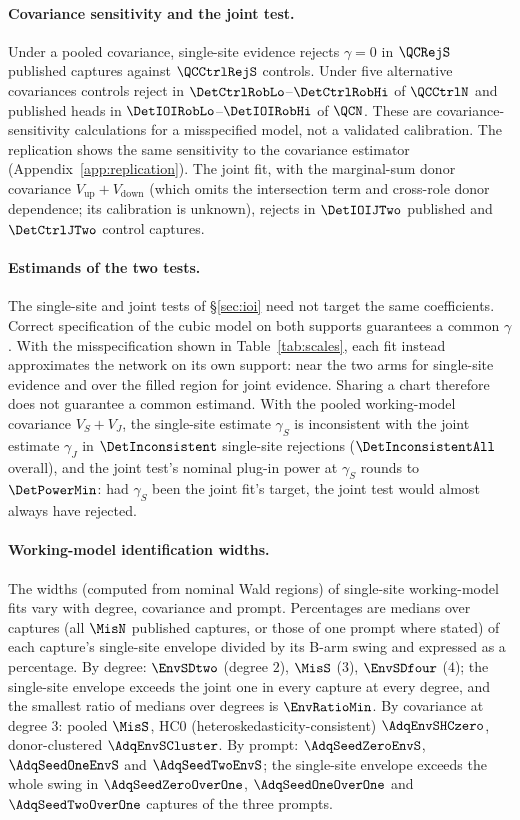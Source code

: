 \paragraph{Covariance sensitivity and the joint test.} Under a pooled covariance, single-site evidence rejects $\gamma=0$ in
$\QCRejS$ published captures against $\QCCtrlRejS$ controls. Under five alternative covariances controls reject in
$\DetCtrlRobLo$--$\DetCtrlRobHi$ of $\QCCtrlN$ and published heads in $\DetIOIRobLo$--$\DetIOIRobHi$ of $\QCN$. These are
covariance-sensitivity calculations for a misspecified model, not a validated calibration. The replication shows the same
sensitivity to the covariance estimator (Appendix~\ref{app:replication}). The joint fit, with the marginal-sum donor covariance
$V_{\mathrm{up}}+V_{\mathrm{down}}$ (which omits the intersection term and cross-role donor dependence; its calibration is
unknown), rejects in $\DetIOIJTwo$ published and $\DetCtrlJTwo$ control captures.

\paragraph{Estimands of the two tests.} The single-site and joint tests of \S\ref{sec:ioi} need not target the same
coefficients. Correct specification of the cubic model on both supports guarantees a common $\gamma$. With the
misspecification shown in Table~\ref{tab:scales}, each fit instead approximates the network on its own support: near the
two arms for single-site evidence and over the filled region for joint evidence. Sharing a chart therefore does not
guarantee a common estimand. With the pooled working-model covariance $V_S+V_J$, the single-site estimate $\gamma_S$ is
inconsistent with the joint estimate $\gamma_J$ in $\DetInconsistent$ single-site rejections ($\DetInconsistentAll$
overall), and the joint test's nominal plug-in power at $\gamma_S$ rounds to $\DetPowerMin$: had $\gamma_S$ been the joint
fit's target, the joint test would almost always have rejected.

\paragraph{Working-model identification widths.} The widths (computed from nominal Wald regions) of single-site working-model fits vary with degree, covariance and prompt.
Percentages are medians over captures (all $\MisN$ published captures, or those of one prompt where stated)
of each capture's single-site envelope divided by its B-arm swing and expressed as a percentage. By degree: $\EnvSDtwo$ (degree $2$), $\MisS$ ($3$), $\EnvSDfour$ ($4$); the single-site
envelope exceeds the joint one in every capture at every degree, and the smallest ratio of medians over degrees is
$\EnvRatioMin$. By covariance at degree $3$: pooled $\MisS$, HC0 (heteroskedasticity-consistent) $\AdqEnvSHCzero$,
donor-clustered $\AdqEnvSCluster$. By prompt: $\AdqSeedZeroEnvS$, $\AdqSeedOneEnvS$ and $\AdqSeedTwoEnvS$; the
single-site envelope exceeds the whole swing in $\AdqSeedZeroOverOne$, $\AdqSeedOneOverOne$ and $\AdqSeedTwoOverOne$
captures of the three prompts.

